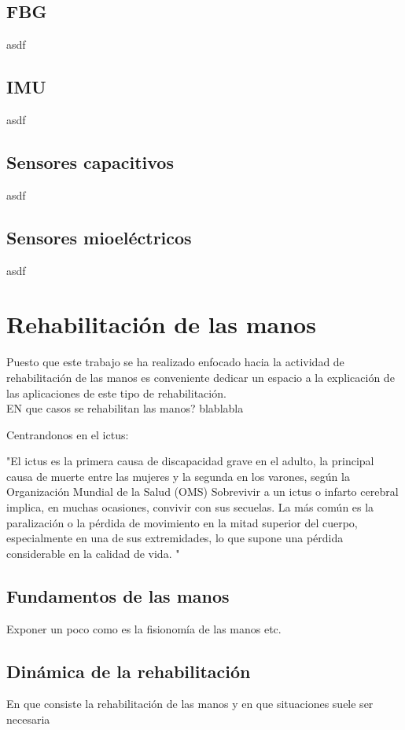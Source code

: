 \subsection{FBG}
\label{sec:fbg2}
asdf

\subsection{IMU}
\label{sec:imu2}
asdf

\subsection{Sensores capacitivos}
\label{sec:capacitivos2}
asdf

\subsection{Sensores mioeléctricos}
\label{sec:mioelectricos2}
asdf


\section{Rehabilitación de las manos}
\label{sec:Rehabilitacion2}
Puesto que este trabajo se ha realizado enfocado hacia la actividad de rehabilitación de las manos es conveniente dedicar un espacio a la explicación de las aplicaciones de este tipo de rehabilitación.\\


EN que casos se rehabilitan las manos? 
blablabla

Centrandonos en el ictus:

"El ictus es la primera causa de discapacidad grave en el adulto, la principal causa de muerte entre las mujeres y la segunda en los varones, según la Organización Mundial de la Salud (OMS) Sobrevivir a un ictus o infarto cerebral implica, en muchas ocasiones, convivir con sus secuelas. La más común es la paralización o la pérdida de movimiento en la mitad superior del cuerpo, especialmente en una de sus extremidades, lo que supone una pérdida considerable en la calidad de vida. "


\subsection{Fundamentos de las manos}
\label{sec:manos2}
Exponer un poco como es la fisionomía de las manos etc.
\subsection{Dinámica de la rehabilitación}
\label{sec:dinamica2}
En que consiste la rehabilitación de las manos y en que situaciones suele ser necesaria\\



